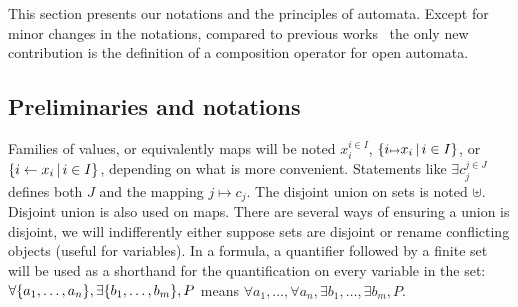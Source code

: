 \documentclass[runningheads]{llncs}
\begin{document}
This section presents our notations and the principles of automata. Except for minor changes in the notations, compared to previous works~\cite{fhbisim} the only new contribution is the definition of a composition operator for open automata.
%



\subsection{Preliminaries and notations}
Families of values, or equivalently maps will be noted \(x_i^{i \in I}\), \(\mset{i \mapsto x_i}{i \in I}\), or \({\left\{i \gets x_i\,\middle|\, i \in I\right\}}\), depending on what is more convenient. Statements like  $\exists c_j^{j \in J}$ defines both $J$ and the mapping ${j \mapsto c_j}$.
The disjoint union on sets is noted \(\uplus\).
Disjoint union is also used on maps.
There are several ways of ensuring a union is disjoint, we will indifferently either suppose sets are disjoint or rename conflicting objects (useful for variables).
In a formula, a quantifier followed by a finite set will be used as a shorthand for the quantification on every variable in the set:
\(\forall {\left\{a_1, \dots, a_n\right\}}, \exists {\left\{b_1, \dots, b_m\right\}}, P\) means \(\forall a_1, \dots, \forall a_n, \exists b_1, \dots, \exists b_m, P\).
\end{document}
